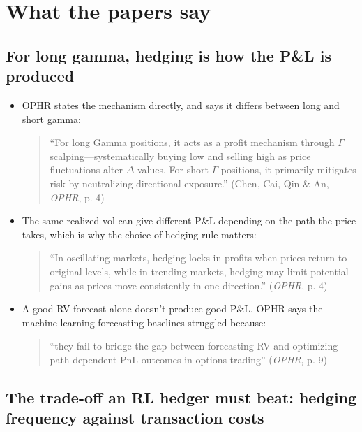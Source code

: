 \documentclass{article}
\begin{document}
\section{What the papers say}

\subsection{For long gamma, hedging is how the P\&L is produced}

\begin{itemize}

\item OPHR states the mechanism directly, and says it differs between long and short gamma:

\begin{quote}``For long Gamma positions, it acts as a profit mechanism through \ensuremath{\Gamma} scalping---systematically buying low and selling high as price fluctuations alter \ensuremath{\Delta} values. For short \ensuremath{\Gamma} positions, it primarily mitigates risk by neutralizing directional exposure.'' (Chen, Cai, Qin \& An, \emph{OPHR}, p. 4)\end{quote}

\item The same realized vol can give different P\&L depending on the path the price takes, which is why the choice of hedging rule matters:

\begin{quote}``In oscillating markets, hedging locks in profits when prices return to original levels, while in trending markets, hedging may limit potential gains as prices move consistently in one direction.'' (\emph{OPHR}, p. 4)\end{quote}

\item A good RV forecast alone doesn't produce good P\&L. OPHR says the machine-learning forecasting baselines struggled because:

\begin{quote}``they fail to bridge the gap between forecasting RV and optimizing path-dependent PnL outcomes in options trading'' (\emph{OPHR}, p. 9)\end{quote}

\end{itemize}

\subsection{The trade-off an RL hedger must beat: hedging frequency against transaction costs}
\end{document}
